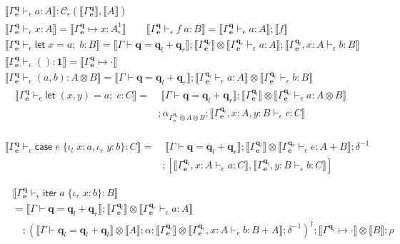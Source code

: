 \documentclass[acmsmall,screen,review]{acmart}
\newcommand{\mc}[1]{\ensuremath{\mathcal{#1}}}
\newcommand{\mb}[1]{\ensuremath{\mathbf{#1}}}
\newcommand{\ms}[1]{\ensuremath{\mathsf{#1}}}
\newcommand{\lto}{:}
\newcommand{\linl}[1]{\iota_l\;{#1}}
\newcommand{\linr}[1]{\iota_r\;{#1}}
\newcommand{\letexpr}[3]{\ensuremath{\ms{let}\;#1 = #2;\;#3}}
\newcommand{\caseexpr}[5]{\ms{case}\;#1\;\{\linl{#2} \lto #3, \linr{#4} \lto #5\}}
\newcommand{\liter}[3]{\ms{iter}\;#1\;\{ \linr{#2} \lto #3 \}}
\newcommand{\qsp}[4]{#1 \vdash #2 = #3 + #4}
\newcommand{\cwk}[2]{#1 \mapsto #2}
\newcommand{\hasty}[4]{#1 \vdash_{#2} #3: {#4}}
\newcommand{\dnt}[1]{\llbracket{#1}\rrbracket}
\newcommand{\oneq}{1}
\begin{document}
\begin{gather*}
  \boxed{\dnt{\hasty{\Gamma^{\mb{q}}_{\mb{e}}}{\epsilon}{a}{A}} 
    : \mc{C}_\epsilon(\dnt{\Gamma^{\mb{q}}_{\mb{e}}}, \dnt{A})} \\
  \dnt{\hasty{\Gamma^{\mb{q}}_{\mb{e}}}{\epsilon}{x}{A}} 
    = \dnt{\cwk{\Gamma^{\mb{q}}_{\mb{e}}}{x : A^\oneq_\epsilon}}
  \qquad
  \dnt{\hasty{\Gamma^{\mb{q}}_{\mb{e}}}{\epsilon}{f\;a}{B}} 
    = \dnt{\hasty{\Gamma^{\mb{q}}_{\mb{e}}}{\epsilon}{a}{A}} ; \dnt{f} \\
  \dnt{\hasty{\Gamma^{\mb{q}}_{\mb{e}}}{\epsilon}{\letexpr{x}{a}{b}}{B}} 
    = \dnt{\qsp{\Gamma}{\mb{q}}{\mb{q}_l}{\mb{q}_r}}
    ; \dnt{\Gamma^{\mb{q}_l}_{\mb{e}}} 
      \otimes \dnt{\hasty{\Gamma^{\mb{q}_r}_{\mb{e}}}{\epsilon}{a}{A}}
    ; \dnt{\hasty{\Gamma^{\mb{q}_l}_{\mb{e}}, x : A}{\epsilon}{b}{B}}
  \\
  \dnt{\hasty{\Gamma^{\mb{q}}_{\mb{e}}}{\epsilon}{()}{\mb{1}}}
    = \dnt{\cwk{\Gamma^{\mb{q}}_{\mb{e}}}{\cdot}}
  \\
  \dnt{\hasty{\Gamma^{\mb{q}}_{\mb{e}}}{\epsilon}{(a, b)}{A \otimes B}}
    = \dnt{\qsp{\Gamma}{\mb{q}}{\mb{q}_l}{\mb{q}_r}}
    ; \dnt{\hasty{\Gamma^{\mb{q}_l}_{\mb{e}}}{\epsilon}{a}{A}}
    \otimes \dnt{\hasty{\Gamma^{\mb{q}_r}_{\mb{e}}}{\epsilon}{b}{B}}
\end{gather*}
\begin{align*}
  \dnt{\hasty{\Gamma^{\mb{q}}_{\mb{e}}}{\epsilon}{\letexpr{(x, y)}{a}{c}}{C}}
  = & \; \dnt{\qsp{\Gamma}{\mb{q}}{\mb{q}_l}{\mb{q}_r}}
    ; \dnt{\Gamma^{\mb{q}_l}_{\mb{e}}}
    \otimes \dnt{\hasty{\Gamma^{\mb{q}_r}_{\mb{e}}}{\epsilon}{a}{A \otimes B}}
  \\ & 
  ; \alpha_{\Gamma^{\mb{q}_r}_{\mb{e}} \otimes A \otimes B}
  ; \dnt{\hasty{\Gamma^{\mb{q}_l}_{\mb{e}}, x : A, y : B}{\epsilon}{c}{C}} \\
\end{align*}

\begin{align*}
  \dnt{\hasty{\Gamma^{\mb{q}}_{\mb{e}}}{\epsilon}{\caseexpr{e}{x}{a}{y}{b}}{C}}
  =& \; 
  \dnt{\qsp{\Gamma}{\mb{q}}{\mb{q}_l}{\mb{q}_r}}
  ; \dnt{\Gamma^{\mb{q}_l}_{\mb{e}}} 
  \otimes \dnt{\hasty{\Gamma^{\mb{q}_r}_{\mb{e}}}{\epsilon}{e}{A + B}}
  ; \delta^{-1} \\ & 
  ; [
    \dnt{\hasty{\Gamma^{\mb{q}_l}_{\mb{e}}, x : A}{\epsilon}{a}{C}},
    \dnt{\hasty{\Gamma^{\mb{q}_l}_{\mb{e}}, y : B}{\epsilon}{b}{C}}
  ]
\end{align*}


\begin{align*}
  &\dnt{\hasty{\Gamma^{\mb{q}}_{\mb{e}}}{\epsilon}{\liter{a}{x}{b}}{B}} \\
  &= 
  \dnt{\qsp{\Gamma}{\mb{q}}{\mb{q}_l}{\mb{q}_r}}
  ; \dnt{\Gamma^{\mb{q}_l}_{\mb{e}}}
    \otimes \dnt{\hasty{\Gamma^{\mb{q}_r}_{\mb{e}}}{\epsilon}{a}{A}} \\ & \quad 
  ; (\dnt{\qsp{\Gamma}{\mb{q}_l}{\mb{q}_l}{\mb{q}_l}} \otimes \dnt{A} 
  ; \alpha
  ; \dnt{\Gamma^{\mb{q}_l}_{\mb{e}}} 
    \otimes \dnt{\hasty{\Gamma^{\mb{q}_r}_{\mb{e}}, x : A}{\epsilon}{b}{B + A}}
  ; \delta^{-1})^\dagger
  ; \dnt{\cwk{\Gamma^{\mb{q}_l}}{\cdot}} \otimes \dnt{B}
  ; \rho
\end{align*}
\end{document}
